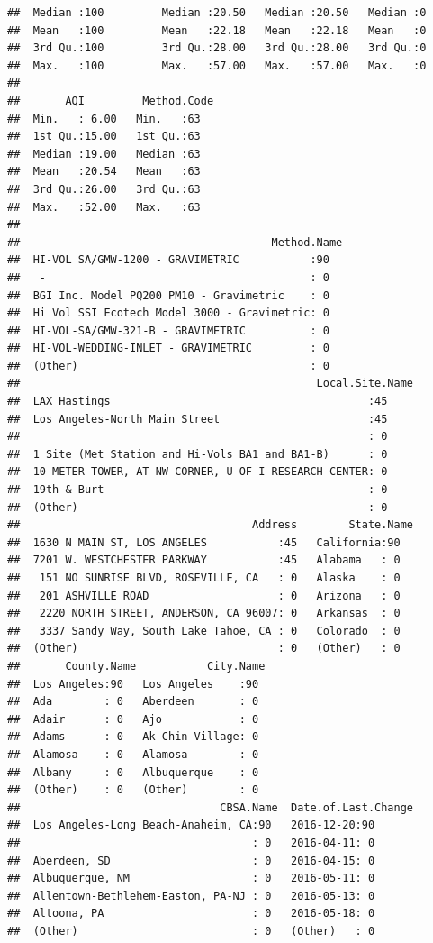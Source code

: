 \documentclass[]{book}
\begin{document}
\begin{verbatim}
##  Median :100         Median :20.50   Median :20.50   Median :0    
##  Mean   :100         Mean   :22.18   Mean   :22.18   Mean   :0    
##  3rd Qu.:100         3rd Qu.:28.00   3rd Qu.:28.00   3rd Qu.:0    
##  Max.   :100         Max.   :57.00   Max.   :57.00   Max.   :0    
##                                                                   
##       AQI         Method.Code
##  Min.   : 6.00   Min.   :63  
##  1st Qu.:15.00   1st Qu.:63  
##  Median :19.00   Median :63  
##  Mean   :20.54   Mean   :63  
##  3rd Qu.:26.00   3rd Qu.:63  
##  Max.   :52.00   Max.   :63  
##                              
##                                       Method.Name
##  HI-VOL SA/GMW-1200 - GRAVIMETRIC           :90  
##   -                                         : 0  
##  BGI Inc. Model PQ200 PM10 - Gravimetric    : 0  
##  Hi Vol SSI Ecotech Model 3000 - Gravimetric: 0  
##  HI-VOL-SA/GMW-321-B - GRAVIMETRIC          : 0  
##  HI-VOL-WEDDING-INLET - GRAVIMETRIC         : 0  
##  (Other)                                    : 0  
##                                              Local.Site.Name
##  LAX Hastings                                        :45    
##  Los Angeles-North Main Street                       :45    
##                                                      : 0    
##  1 Site (Met Station and Hi-Vols BA1 and BA1-B)      : 0    
##  10 METER TOWER, AT NW CORNER, U OF I RESEARCH CENTER: 0    
##  19th & Burt                                         : 0    
##  (Other)                                             : 0    
##                                    Address        State.Name
##  1630 N MAIN ST, LOS ANGELES           :45   California:90  
##  7201 W. WESTCHESTER PARKWAY           :45   Alabama   : 0  
##   151 NO SUNRISE BLVD, ROSEVILLE, CA   : 0   Alaska    : 0  
##   201 ASHVILLE ROAD                    : 0   Arizona   : 0  
##   2220 NORTH STREET, ANDERSON, CA 96007: 0   Arkansas  : 0  
##   3337 Sandy Way, South Lake Tahoe, CA : 0   Colorado  : 0  
##  (Other)                               : 0   (Other)   : 0  
##       County.Name           City.Name 
##  Los Angeles:90   Los Angeles    :90  
##  Ada        : 0   Aberdeen       : 0  
##  Adair      : 0   Ajo            : 0  
##  Adams      : 0   Ak-Chin Village: 0  
##  Alamosa    : 0   Alamosa        : 0  
##  Albany     : 0   Albuquerque    : 0  
##  (Other)    : 0   (Other)        : 0  
##                               CBSA.Name  Date.of.Last.Change
##  Los Angeles-Long Beach-Anaheim, CA:90   2016-12-20:90      
##                                    : 0   2016-04-11: 0      
##  Aberdeen, SD                      : 0   2016-04-15: 0      
##  Albuquerque, NM                   : 0   2016-05-11: 0      
##  Allentown-Bethlehem-Easton, PA-NJ : 0   2016-05-13: 0      
##  Altoona, PA                       : 0   2016-05-18: 0      
##  (Other)                           : 0   (Other)   : 0
\end{verbatim}
\end{document}
